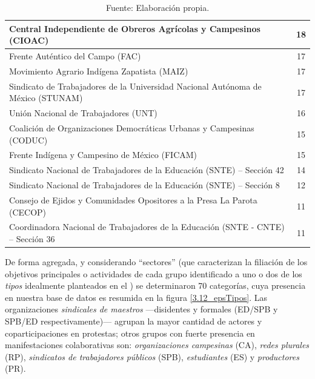 \documentclass[letterpaper, 11pt]{book}
\theoremstyle{definition}
\theoremstyle{remark}
\begin{document}
\begin{table}[!hbt]
\begin{tabular}{ | l | c | }
\hline
Central Independiente de Obreros Agrícolas y Campesinos (CIOAC) & 18\\
\hline
Frente Auténtico del Campo (FAC) & 17\\
\hline
Movimiento Agrario Indígena Zapatista (MAIZ) & 17\\
\hline
Sindicato de Trabajadores de la Universidad Nacional Autónoma de México (STUNAM) & 17\\
\hline
Unión Nacional de Trabajadores (UNT) & 16\\
\hline
Coalición de Organizaciones Democráticas Urbanas y Campesinas (CODUC) & 15\\
\hline
Frente Indígena y Campesino de México (FICAM) & 15\\
\hline
Sindicato Nacional de Trabajadores de la Educación (SNTE) -- Sección 42 & 14\\
\hline
Sindicato Nacional de Trabajadores de la Educación (SNTE) -- Sección 8 & 12\\
\hline
Consejo de Ejidos y Comunidades Opositores a la Presa La Parota (CECOP) & 11\\
\hline
Coordinadora Nacional de Trabajadores de la Educación (SNTE - CNTE) -- Sección 36 & 11\\
\hline
\end{tabular}
\par\bigskip
\caption*{\small Fuente: Elaboración propia.}
\end{table}

\pagebreak



De forma agregada, y considerando ``sectores'' 
(que caracterizan la filiación de los objetivos principales o actividades de cada grupo identificado a uno o dos de los \emph{tipos} idealmente planteados en el ) se determinaron 70 categorías, cuya presencia en nuestra base de datos es resumida en la figura \ref{3.12_epsTipos}. 
Las organizaciones \emph{sindicales de maestros} ---disidentes y formales (ED/SPB y SPB/ED respectivamente)--- agrupan la mayor cantidad de actores y coparticipaciones en protestas; otros grupos con fuerte presencia en manifestaciones colaborativas son: \emph{organizaciones campesinas} (CA), \emph{redes plurales} (RP), \emph{sindicatos de trabajadores públicos} (SPB), \emph{estudiantes} (ES) y \emph{productores} (PR).
\end{document}

